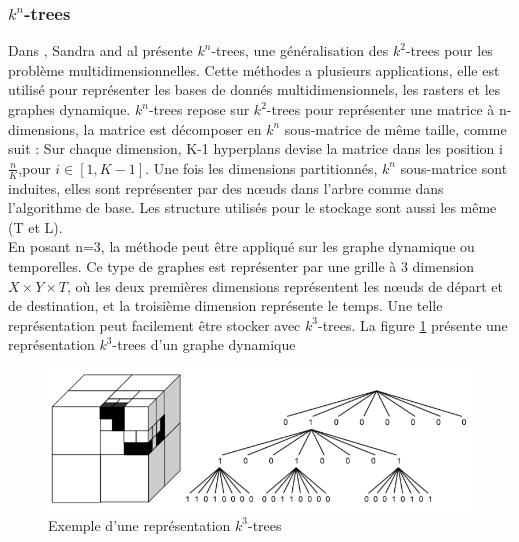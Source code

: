 \subsubsection{$k^n$-trees}
Dans \citep{de2013compact}, Sandra and al présente $k^n$-trees, une généralisation des $k^2$-trees pour les problème multidimensionnelles. Cette méthodes a plusieurs applications, elle est utilisé pour représenter les bases de donnés multidimensionnels, les rasters et les graphes dynamique. $k^n$-trees repose sur $k^2$-trees pour représenter une matrice à n-dimensions, la matrice est décomposer en $k^n$ sous-matrice de même taille, comme suit : Sur chaque dimension, K-1 hyperplans devise la matrice dans les position i$\frac{n}{K}$,pour $i \in [1, K-1]$. Une fois les dimensions partitionnés, $k^n$ sous-matrice sont induites, elles sont représenter  par des nœuds dans l'arbre comme dans l'algorithme de base. Les structure utilisés pour le stockage sont aussi les même (T et L).\\
En posant n=3, la méthode peut être appliqué sur les graphe dynamique ou temporelles. Ce type de graphes est représenter par une grille à 3 dimension $X \times Y \times T$, où les deux premières dimensions représentent les nœuds de départ et de destination, et la troisième dimension représente le temps. Une telle représentation peut facilement être stocker avec $k^3$-trees.
La figure \ref{kn-trees} présente une représentation $k^3$-trees d'un graphe dynamique \citep{de2014new}

\begin{figure}[H]
\begin{center}
\includegraphics[height=100 pt, width=380 pt]{./ressources/image/kn-trees.png} 
\end{center}
\caption{Exemple d'une représentation $k^3$-trees}
\label{kn-trees}
\end{figure}



